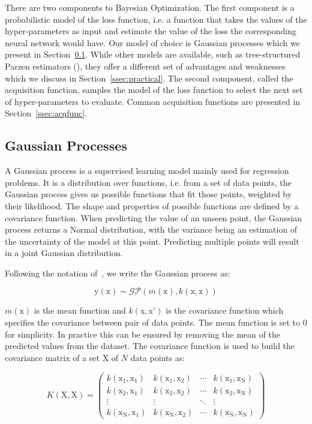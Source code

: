 There are two components to Bayesian Optimization. The first component is a probabilistic model of the loss function, i.e. a function that takes the values of the hyper-parameters as input and estimate the value of the loss the corresponding neural network would have. Our model of choice is Gaussian processes which we present in Section~\ref{ssec:gp}. While other models are available, such as tree-structured Parzen estimators (\textcite{bergstra2011NIPS}), they offer a different set of advantages and weaknesses which we discuss in Section~\ref{ssec:practical}. The second component, called the acquisition function, samples the model of the loss function to select the next set of hyper-parameters to evaluate. Common acquisition functions are presented in Section~\ref{ssec:acqfunc}.

\subsection{Gaussian Processes}
\label{ssec:gp}

A Gaussian process is a supervised learning model mainly used for regression problems. It is a distribution over functions, i.e. from a set of data points, the Gaussian process gives us possible functions that fit those points, weighted by their likelihood. The shape and properties of possible functions are defined by a covariance function. When predicting the value of an unseen point, the Gaussian process returns a Normal distribution, with the variance being an estimation of the uncertainty of the model at this point. Predicting multiple points will result in a joint Gaussian distribution.

Following the notation of~\textcite{rasmussen2005}, we write the Gaussian process as:

\begin{equation}
    \mathrm{y}(\mathrm{x}) \sim \mathcal{GP} \left( m(\mathrm{x}), k(\mathrm{x}, \mathrm{x}) \right)
\end{equation}

$m(\mathrm{x})$ is the mean function and $k(\mathrm{x}, \mathrm{x'})$ is the covariance function which specifies the covariance between pair of data points. The mean function is set to $0$ for simplicity. In practice this can be ensured by removing the mean of the predicted values from the dataset. The covariance function is used to build the covariance matrix of a set $\mathrm{X}$ of $N$ data points as:

\begin{equation}
    K(\mathrm{X}, \mathrm{X}) = 
    \begin{pmatrix}
    k(\mathrm{x_1}, \mathrm{x_1}) & k(\mathrm{x_1}, \mathrm{x_2}) & \cdots & k(\mathrm{x_1}, \mathrm{x_N}) \\
    k(\mathrm{x_2}, \mathrm{x_1}) & k(\mathrm{x_2}, \mathrm{x_2}) & \cdots & k(\mathrm{x_2}, \mathrm{x_N}) \\
    \vdots & \vdots & \ddots & \vdots \\
    k(\mathrm{x_N}, \mathrm{x_1}) & k(\mathrm{x_N}, \mathrm{x_2}) & \cdots & k(\mathrm{x_N}, \mathrm{x_N})
    \end{pmatrix}
\end{equation}

